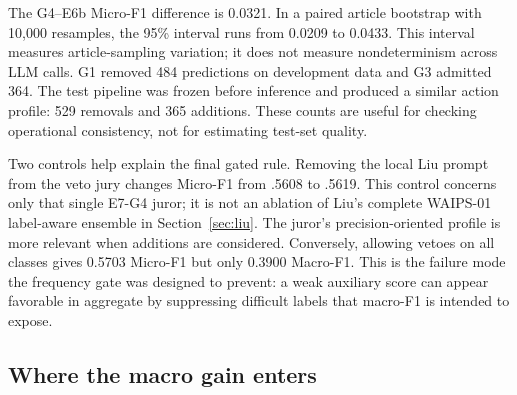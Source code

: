 \documentclass[sigconf,article,a4paper]{acmart}
\begin{document}
\begin{table}[H]
  \caption{Development results. T18 is Micro-F1 over the 18 augmentation targets.}
  \label{tab:dev}
  \centering
\end{table}

The G4--E6b Micro-F1 difference is 0.0321. In a paired article bootstrap with
10,000 resamples, the 95\% interval runs from 0.0209 to 0.0433. This interval
measures article-sampling variation; it does not measure nondeterminism across
LLM calls. G1 removed 484 predictions on development data and
G3 admitted 364. The test pipeline was frozen before inference and produced a
similar action profile: 529 removals and 365 additions. These counts are useful
for checking operational consistency, not for estimating test-set quality.

Two controls help explain the final gated rule. Removing the local Liu prompt
from the veto jury changes Micro-F1 from .5608 to .5619. This control concerns
only that single E7-G4 juror; it is not an ablation of Liu's complete WAIPS-01
label-aware ensemble in Section~\ref{sec:liu}. The juror's precision-oriented
profile is more relevant when additions are considered. Conversely, allowing
vetoes on all classes gives 0.5703 Micro-F1
but only 0.3900 Macro-F1. This is the failure mode the frequency gate was
designed to prevent: a weak auxiliary score can appear favorable in aggregate
by suppressing difficult labels that macro-F1 is intended to expose.

\subsection{Where the macro gain enters}
\end{document}
